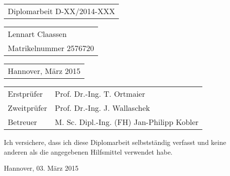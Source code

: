 \begin{titlepage}
\begin{spacing}{2}

\begin{flushright} %
	\vspace*{-20mm}
\end{flushright} %

\vspace{38mm} {

\vfill


\vfill }
\end{spacing}
\begin{spacing}{1}
\begin{tabular}{l}
 \Large{Diplomarbeit D-XX/2014-XXX}
\end{tabular}

\vspace{5mm}

\begin{tabular}{l}
\large{Lennart Claassen}\\
\large{Matrikelnummer 2576720}
\end{tabular}

\vspace{5mm}

\begin{tabular}{l}
\large{Hannover, März 2015}
\end{tabular}


\vspace{5mm}
{\large
\begin{tabular}{l l}
Erstprüfer  & Prof. Dr.-Ing. T. Ortmaier\\
Zweitprüfer & Prof. Dr.-Ing. J. Wallaschek\\
Betreuer    & M. Sc. Dipl.-Ing. (FH) Jan-Philipp Kobler\\
\end{tabular}
}

\end{spacing}
\end{titlepage}




%
%
%


\noindent Ich versichere, dass ich diese Diplomarbeit selbstständig
verfasst und keine anderen als die angegebenen Hilfsmittel verwendet
habe.

\vspace{25mm}

\noindent Hannover, 03. März 2015
\newpage
